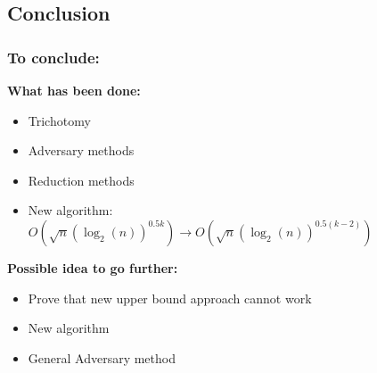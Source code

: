 \documentclass[9pt, notheorems]{beamer}
\theoremstyle{definition}
\theoremstyle{plain}
\theoremstyle{definition}
\begin{document}
\subsection{Conclusion}

\begin{frame}
    \frametitle{To conclude:}
    \textbf{What has been done:}
    \begin{itemize}
        \item Trichotomy
        \item Adversary methods
        \item Reduction methods
        \item New algorithm: $O\left(\sqrt{n}(\log_2(n))^{0.5k}\right) \rightarrow O\left(\sqrt{n}(\log_2(n))^{0.5(k-2)} \right)$
    \end{itemize}
    \pause
    \textbf{Possible idea to go further:}
    \begin{itemize}
        \item Prove that new upper bound approach cannot work
        \item New algorithm
        \item General Adversary method
    \end{itemize}

\end{frame}


\begin{frame}
    
    

\end{frame}
\end{document}
